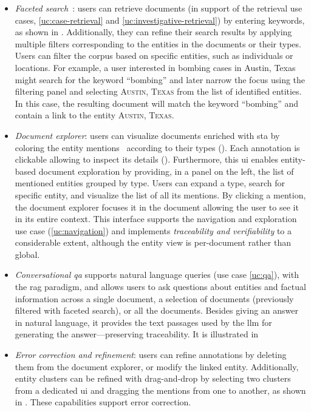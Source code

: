 \begin{itemize}
    \item  \emph{Faceted search}~\cite{ARMENTANO2014_nlp_faceted,hearst_2006_faceted}: users can retrieve documents (in support of the retrieval use cases, \ref{uc:case-retrieval} and \ref{uc:investigative-retrieval}) by entering keywords, as shown in . Additionally, they can refine their search results by applying multiple filters corresponding to the entities in the documents or their types. Users can filter the corpus based on specific entities, such as individuals or locations. For example, a user interested in bombing cases in Austin, Texas might search for the keyword ``bombing'' and later narrow the focus using the filtering panel and selecting \textsc{Austin, Texas} from the list of identified entities. In this case, the resulting document will match the keyword ``bombing'' and contain a link to the entity \textsc{Austin, Texas}.

    
    \item  \emph{Document explorer}: users can visualize documents enriched with \acl{sta} by coloring the entity mentions~\cite{swoopes2025interfacedesignsupportlegal,ziwei_abstractexplorer_2025,raymond_skimming_sci_2023} according to their types (). Each annotation is clickable allowing to inspect its details ().
    Furthermore, this \ac{ui} enables entity-based document exploration by providing, in a panel on the left, the list of mentioned entities grouped by type. Users can expand a type, search for specific entity, and visualize the list of all its mentions. By clicking a mention, the document explorer focuses it in the document allowing the user to see it in its entire context.  
    This interface supports the navigation and exploration use case (\ref{uc:navigation}) and implements \emph{traceability and verifiability} to a considerable extent, although the entity view is per-document rather than global.

    \item  \emph{Conversational \acl{qa}} supports natural language queries (use case \ref{uc:qa}), with the \acf{rag} paradigm, and allows users to ask questions about entities and factual information across a single document, a selection of documents (previously filtered with faceted search), or all the documents. Besides giving an answer in natural language, it provides the text passages used by the \ac{llm} for generating the answer---preserving traceability. It is illustrated in 

    \item  \emph{Error correction and refinement}: users can refine annotations by deleting them from the document explorer, or modify the linked entity. Additionally, entity clusters can be refined with drag-and-drop by selecting two clusters from a dedicated \ac{ui} and dragging the mentions from one to another, as shown in . These capabilities support error correction.
    
\end{itemize}

